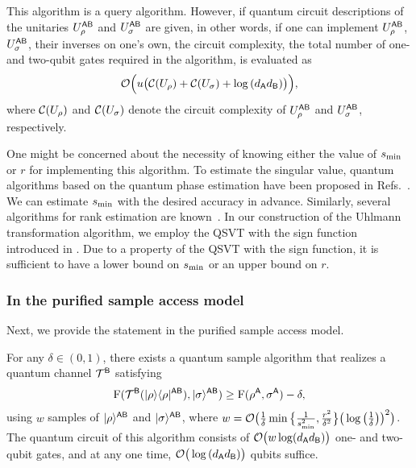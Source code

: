 This algorithm is a query algorithm. However, if quantum circuit descriptions of the unitaries $U_\rho^{{\mathsf{A}}{\mathsf{B}}}$ and $U_\sigma^{{\mathsf{A}}{\mathsf{B}}}$ are given, in other words, if one can implement $U_\rho^{{\mathsf{A}}{\mathsf{B}}}$, $U_\sigma^{{\mathsf{A}}{\mathsf{B}}}$, their inverses on one's own, the circuit complexity, the total number of one- and two-qubit gates required in the algorithm, is evaluated as
\begin{align}
    {\mathcal{O}}\Big(u \big({\mathcal{C}}(U_\rho) + {\mathcal{C}}(U_\sigma) + \log{(d_{\mathsf{A}}d_{\mathsf{B}})}\big)\Big),
\end{align}
where ${\mathcal{C}}(U_\rho)$ and ${\mathcal{C}}(U_\sigma)$ denote the circuit complexity of $U_\rho^{{\mathsf{A}}{\mathsf{B}}}$ and $U_\sigma^{{\mathsf{A}}{\mathsf{B}}}$, respectively.


One might be concerned about the necessity of knowing either the value of $s_{\rm min}$ or $r$ for implementing this algorithm.
To estimate the singular value, quantum algorithms based on the quantum phase estimation have been proposed in Refs.~\cite{chakraborty2019powerblock, Gilyn2019thesis}.
We can estimate $s_{\rm min}$ with the desired accuracy in advance.
Similarly, several algorithms for rank estimation are known~\cite{Tan2021ValEstRank, wang2024NewQuantEnt}.
In our construction of the Uhlmann transformation algorithm, we employ the QSVT with the sign function introduced in .
Due to a property of the QSVT with the sign function, it is sufficient to have a lower bound on $s_{\rm min}$ or an upper bound on $r$.









\subsubsection{In the purified sample access model}
\label{sec:upper purif sample main}


Next, we provide the statement in the purified sample access model.

\begin{theorem}
\label{infthm:uhlmenn purif sample}
For any $\delta \in (0, 1)$, there exists a quantum sample algorithm that realizes a quantum channel ${\mathcal{T}}^{{\mathsf{B}}}$ satisfying
\begin{align}
\label{eq:fid diff pure samp}
     {\mathrm{F}}({\mathcal{T}}^{{\mathsf{B}}}(|\rho\rangle\langle\rho|^{{\mathsf{A}}{\mathsf{B}}}), |\sigma\rangle^{{\mathsf{A}}{\mathsf{B}}}) \geq {\mathrm{F}}(\rho^{\mathsf{A}}, \sigma^{\mathsf{A}}) - \delta,
\end{align}
using $w$ samples of $|\rho\rangle^{{\mathsf{A}}{\mathsf{B}}}$ and $|\sigma\rangle^{{\mathsf{A}}{\mathsf{B}}}$, where $w = {\mathcal{O}}\big(\frac{1}{\delta}\min\big\{\frac{1}{s_{\rm min}^2}, \frac{r^2}{\delta^2}\big\}\big(\log{\big(\frac{1}{\delta}\big)}\big)^2\big)$. The quantum circuit of this algorithm consists of ${\mathcal{O}}\big(w\log (d_{\mathsf{A}} d_{\mathsf{B}})\big)$ one- and two-qubit gates, and at any one time, ${\mathcal{O}}\big(\log{(d_{\mathsf{A}}d_{\mathsf{B}})}\big)$ qubits suffice.
\end{theorem}

